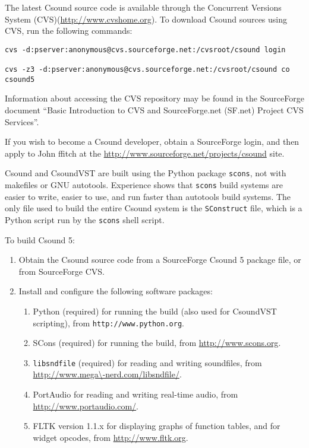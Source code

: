 \documentclass[10pt,letterpaper,onecolumn]{ltxguide}
\begin{document}
The latest Csound source code is available through the Concurrent Versions System (CVS)(\url{http://www.cvshome.org}). To download Csound sources using CVS, run the following commands:

\begin{lstlisting}
cvs -d:pserver:anonymous@cvs.sourceforge.net:/cvsroot/csound login 
 
cvs -z3 -d:pserver:anonymous@cvs.sourceforge.net:/cvsroot/csound co csound5 
\end{lstlisting}

Information about accessing the CVS repository may be found in the SourceForge document ``Basic Introduction to CVS and SourceForge.net (SF.net) Project CVS Services''. 

If you wish to become a Csound developer, obtain a SourceForge login, and then apply to John ffitch at the \url{http://www.sourceforge.net/projects/csound} site.

Csound and CsoundVST are built using the Python package \texttt{scons}, not with makefiles or GNU autotools. Experience shows that \texttt{scons} build systems are easier to write, easier to use, and run faster than autotools build systems. The only file used to build the entire Csound system is the \texttt{SConstruct} file, which is a Python script run by the \texttt{scons} shell script.

To build Csound 5:
\begin{enumerate}
\item Obtain the Csound source code from a SourceForge Csound 5 package file, or from SourceForge CVS.
\item Install and configure the following software packages:
\begin{enumerate}
\item Python (required) for running the build (also used for CsoundVST scripting), from \texttt{http://www.python.org}.
\item SCons (required) for running the build, from \url{http://www.scons.org}.
\item \texttt{libsndfile} (required) for reading and writing soundfiles, from \url{http://www.mega\-nerd.com/libsndfile/}.
\item PortAudio for reading and writing real-time audio, from \url{http://www.portaudio.com/}.
\item FLTK version 1.1.x for displaying graphs of function tables, and for widget opcodes, from \url{http://www.fltk.org}.
\end{enumerate}
\end{enumerate}
\end{document}
